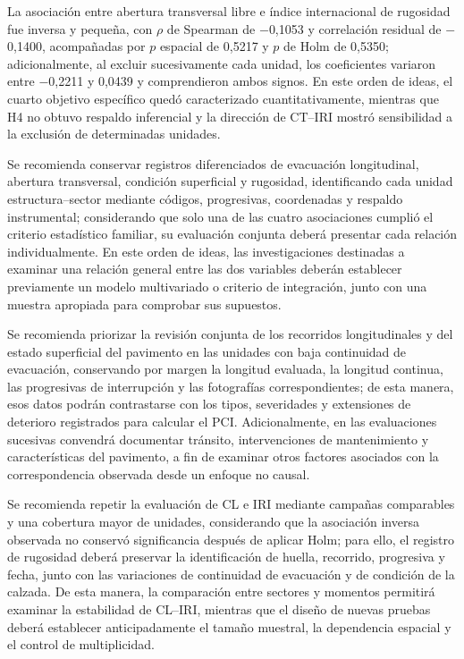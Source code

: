 La asociación entre abertura transversal libre e índice internacional de rugosidad fue inversa y pequeña, con $\rho$ de Spearman de $-$0,1053 y correlación residual de $-$0,1400, acompañadas por $p$ espacial de 0,5217 y $p$ de Holm de 0,5350; adicionalmente, al excluir sucesivamente cada unidad, los coeficientes variaron entre $-$0,2211 y 0,0439 y comprendieron ambos signos. En este orden de ideas, el cuarto objetivo específico quedó caracterizado cuantitativamente, mientras que H4 no obtuvo respaldo inferencial y la dirección de CT--IRI mostró sensibilidad a la exclusión de determinadas unidades.


Se recomienda conservar registros diferenciados de evacuación longitudinal, abertura transversal, condición superficial y rugosidad, identificando cada unidad estructura--sector mediante códigos, progresivas, coordenadas y respaldo instrumental; considerando que solo una de las cuatro asociaciones cumplió el criterio estadístico familiar, su evaluación conjunta deberá presentar cada relación individualmente. En este orden de ideas, las investigaciones destinadas a examinar una relación general entre las dos variables deberán establecer previamente un modelo multivariado o criterio de integración, junto con una muestra apropiada para comprobar sus supuestos.

Se recomienda priorizar la revisión conjunta de los recorridos longitudinales y del estado superficial del pavimento en las unidades con baja continuidad de evacuación, conservando por margen la longitud evaluada, la longitud continua, las progresivas de interrupción y las fotografías correspondientes; de esta manera, esos datos podrán contrastarse con los tipos, severidades y extensiones de deterioro registrados para calcular el PCI. Adicionalmente, en las evaluaciones sucesivas convendrá documentar tránsito, intervenciones de mantenimiento y características del pavimento, a fin de examinar otros factores asociados con la correspondencia observada desde un enfoque no causal.

Se recomienda repetir la evaluación de CL e IRI mediante campañas comparables y una cobertura mayor de unidades, considerando que la asociación inversa observada no conservó significancia después de aplicar Holm; para ello, el registro de rugosidad deberá preservar la identificación de huella, recorrido, progresiva y fecha, junto con las variaciones de continuidad de evacuación y de condición de la calzada. De esta manera, la comparación entre sectores y momentos permitirá examinar la estabilidad de CL--IRI, mientras que el diseño de nuevas pruebas deberá establecer anticipadamente el tamaño muestral, la dependencia espacial y el control de multiplicidad.

